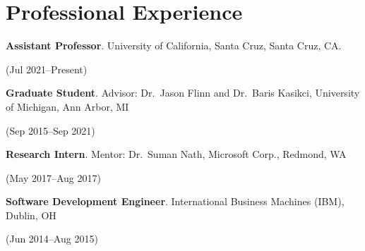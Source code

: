 \documentclass[letterpaper,10pt]{article}
\newcommand{\sidebyside}[2]{
  \begin{minipage}[t]{.75\textwidth}
    \raggedright{}
    #2
  \end{minipage}
  \hspace{.01\textwidth}
    \begin{minipage}[t]{.205\textwidth}
    \raggedleft
    #1
  \end{minipage}
}
\newcommand{\trio}[3]{\sidebyside{#3}{\textbf{#1}. #2}}
\begin{document}
\section{Professional Experience}
\begin{smenumerate}
\item\trio{Assistant Professor}{ University of California, Santa Cruz, Santa Cruz, CA.}{(Jul 2021--Present)}
\item\trio{Graduate Student}{Advisor: Dr.\ Jason Flinn and Dr.\ Baris Kasikci,
  University of Michigan, Ann Arbor, MI}{(Sep 2015--Sep 2021)}
\item\trio{Research Intern}{Mentor: Dr.\ Suman Nath, Microsoft Corp.,
  Redmond, WA}{(May 2017--Aug 2017)}
\item\trio{Software Development Engineer}{International Business Machines (IBM),
  Dublin, OH}{(Jun 2014--Aug 2015)}
\end{smenumerate}
\end{document}
